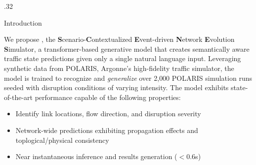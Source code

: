 \documentclass[final]{beamer}
\begin{document}
\begin{frame}[t]
\begin{columns}[t,onlytextwidth]
\begin{column}{.32\textwidth}
\begin{chbox}{Introduction}
      
      We propose \textbf{}, the \textbf{S}cenario-\textbf{C}ontextualized \textbf{E}vent-driven \textbf{N}etwork \textbf{E}volution \textbf{S}imulator, a transformer-based generative model that creates semantically aware traffic state predictions given only a single natural language input. Leveraging synthetic data from POLARIS, Argonne's high-fidelity traffic simulator, the model is trained to recognize and \emph{generalize} over 2{,}000 POLARIS simulation runs seeded with disruption conditions of varying intensity. The model exhibits state-of-the-art performance capable of the following properties:
      \begin{itemize}
        \item Identify link locations, flow direction, and disruption severity 
        \item Network-wide predictions exhibiting propagation effects and toplogical/physical consistency
        \item Near instantaneous inference and results generation ($ < 0.6$s)
      \end{itemize}


      \end{chbox}


\end{column}
\end{columns}
\end{frame}
\end{document}
